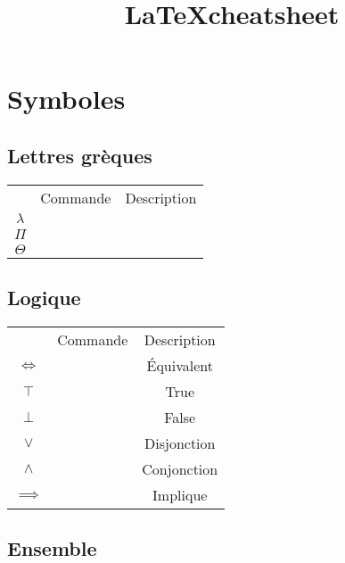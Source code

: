 \documentclass[11pt,a4paper]{article}
\title{\LaTeX cheatsheet}
\def\X#1{$#1$ &\tt\string#1} %
\begin{document}
	\maketitle
	
	\section{Symboles}
	
	\subsection{Lettres grèques}
	\begin{center}
		\begin{tabu}{|c|c|c|}
			\everyrow{\hline}
			\hline
			 & Commande & Description\\
			\X\lambda &\\
			\X\Pi &\\
			\X\Theta &\\
		\end{tabu}
	\end{center}
	
	\subsection{Logique}
	
	\begin{center}
		\begin{tabu}{|c|c|c|}
			\everyrow{\hline}
			\hline
			 & Commande & Description\\
			\X\Leftrightarrow & Équivalent\\
			\X\top & True\\
			\X\bot & False\\
			\X\lor & Disjonction\\
			\X\land & Conjonction\\
			\X\implies & Implique\\
		\end{tabu}
	\end{center}
	
	\subsection{Ensemble}
	
\end{document}
